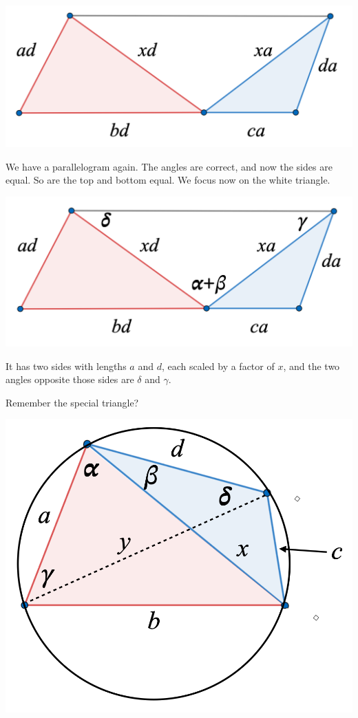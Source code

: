 \documentclass[11pt, oneside]{article}
\begin{document}
\begin{center} \includegraphics [scale=0.2] {Ptol9.png} \end{center}

We have a parallelogram again.  The angles are correct, and now the sides are equal.  So are the top and bottom equal.  We focus now on the white triangle.

\begin{center} \includegraphics [scale=0.2] {Ptol10.png} \end{center}

It has two sides with lengths $a$ and $d$, each scaled by a factor of $x$, and the two angles opposite those sides are $\delta$ and $\gamma$.

Remember the special triangle?
\begin{center} \includegraphics [scale=0.2] {Ptol12.png} \end{center}
\end{document}
